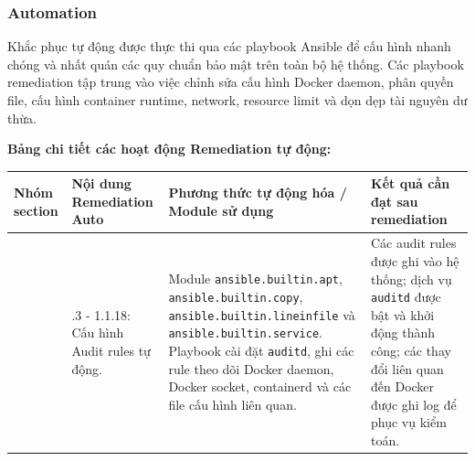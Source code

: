 
\subsubsection{Automation}\label{trien-khai-remediate-automation}

Khắc phục tự động được thực thi qua các playbook Ansible để cấu hình nhanh chóng và nhất quán các quy chuẩn bảo mật trên toàn bộ hệ thống. Các playbook remediation tập trung vào việc chỉnh sửa cấu hình Docker daemon, phân quyền file, cấu hình container runtime, network, resource limit và dọn dẹp tài nguyên dư thừa.

\textbf{Bảng chi tiết các hoạt động Remediation tự động:}

{\def\LTcaptype{none}
\begin{center}
\label{tab:chi-tiet-khac-phuc-tu-dong}
\end{center}
\begin{longtable}{@{}|
  >{\raggedright\arraybackslash}p{}|
  >{\raggedright\arraybackslash}p{}|
  >{\raggedright\arraybackslash}p{}|
  >{\raggedright\arraybackslash}p{}|@{}}
\hline
\begin{minipage}[b]{\linewidth}\raggedright
\textbf{Nhóm section}
\end{minipage} & \begin{minipage}[b]{\linewidth}\raggedright
\textbf{Nội dung Remediation Auto}
\end{minipage} & \begin{minipage}[b]{\linewidth}\raggedright
\textbf{Phương thức tự động hóa / Module sử dụng}
\end{minipage} & \begin{minipage}[b]{\linewidth}\raggedright
\textbf{Kết quả cần đạt sau remediation}
\end{minipage} \\
\hline
\endhead

1 & 1.1.3 - 1.1.18: Cấu hình Audit rules tự động. & Module \texttt{ansible.builtin.apt}, \texttt{ansible.builtin.copy}, \texttt{ansible.builtin.lineinfile} và \texttt{ansible.builtin.service}. Playbook cài đặt \texttt{auditd}, ghi các rule theo dõi Docker daemon, Docker socket, containerd và các file cấu hình liên quan. & Các audit rules được ghi vào hệ thống; dịch vụ \texttt{auditd} được bật và khởi động thành công; các thay đổi liên quan đến Docker được ghi log để phục vụ kiểm toán. \\
\hline


\end{longtable}}
